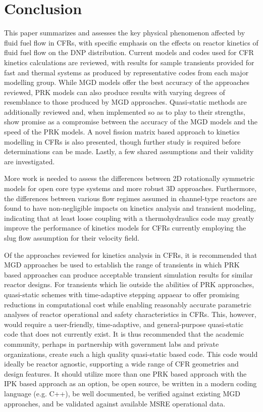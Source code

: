 \documentclass[review]{elsarticle}
\begin{document}
\section{Conclusion} \label{sec:conc}
This paper summarizes and assesses the key physical phenomenon affected
 by fluid fuel
flow in CFRs, with specific emphasis on the effects on reactor kinetics of fluid fuel flow
on the DNP distribution.
Current models and codes used for
CFR kinetics calculations are reviewed, with results for sample transients provided for
fast and thermal systems as produced by representative codes from each major
modelling group. While MGD models offer the best accuracy of the
approaches reviewed, PRK models can also
produce results with varying degrees of resemblance to
those produced by MGD approaches. Quasi-static methods are additionally 
reviewed and, when implemented so as to play to their strengths, show promise
as a compromise between the accuracy of the MGD models and the speed of the PRK
models. A novel fission matrix based approach to kinetics modelling in CFRs is
also presented, though further study is required before determinations can be
made. Lastly, a few shared assumptions and their validity are investigated.
\par More work is needed to assess the differences between 2D 
rotationally symmetric models for open core type systems and more robust 3D
approaches. Furthermore, the differences between various flow regimes assumed
in channel-type reactors are found to have non-negligible impacts on kinetics
analysis and transient modeling, indicating that at least loose coupling with
a thermohydraulics code may greatly improve the performance of kinetics models
for CFRs currently employing the slug flow assumption for their velocity field.
\par Of the approaches reviewed for 
kinetics analysis in CFRs, it is recommended that MGD approaches be used
to establish the range of transients in which PRK based approaches can produce
acceptable transient simulation results for similar reactor designs.
For transients which lie outside the
abilities of PRK approaches, quasi-static schemes with time-adaptive
stepping appaear to offer promising reductions in 
computational cost while enabling reasonably accurate parametric analyses of reactor operational
and safety characteristics in CFRs.
This, however, would require a
user-friendly, time-adaptive, and general-purpose quasi-static code that does not currently exist. It is 
thus recommended that the academic community, perhaps in partnership with
government labs and private organizations, create such a high quality quasi-static
based code. This code would ideally be reactor agnostic, supporting a wide range of  
CFR geometries and design features. It should utilize more than one PRK based approach with the IPK based approach as an
option, be open source, be written in a modern coding language (e.g. C++), 
be well documented, be verified against existing MGD approaches, and
be validated against available MSRE operational data.
\end{document}

